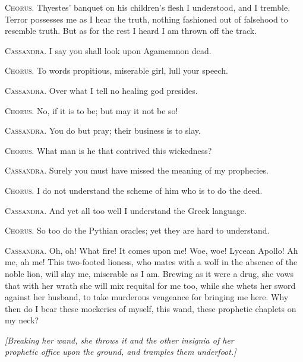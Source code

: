 \documentclass[12pt]{article}
\begin{document}
\textsc{Chorus.} Thyestes' banquet on his children's flesh I understood, and I tremble. Terror possesses me as I hear the truth, nothing fashioned out of falsehood to resemble truth. But as for the rest I heard I am thrown off the track.

\textsc{Cassandra.} I say you shall look upon Agamemnon dead.

\textsc{Chorus.} To words propitious, miserable girl, lull your speech.

\textsc{Cassandra.} Over what I tell no healing god presides.

\textsc{Chorus.} No, if it is to be; but may it not be so!

\textsc{Cassandra.} You do but pray; their business is to slay.

\textsc{Chorus.} What man is he that contrived this wickedness?

\textsc{Cassandra.} Surely you must have missed the meaning of my prophecies.

\textsc{Chorus.} I do not understand the scheme of him who is to do the deed.

\textsc{Cassandra.} And yet all too well I understand the Greek language.

\textsc{Chorus.} So too do the Pythian oracles; yet they are hard to understand.

\textsc{Cassandra.} Oh, oh! What fire! It comes upon me! Woe, woe! Lycean Apollo! Ah me, ah me! This two-footed lioness, who mates with a wolf in the absence of the noble lion, will slay me, miserable as I am. Brewing as it were a drug, she vows that with her wrath she will mix requital for me too, while she whets her sword against her husband, to take murderous vengeance for bringing me here. Why then do I bear these mockeries of myself, this wand, these prophetic chaplets on my neck?

\begin{center}
\textit{[Breaking her wand, she throws it and the other insignia of her\\
prophetic office upon the ground, and tramples them underfoot.]}
\end{center}
\end{document}
